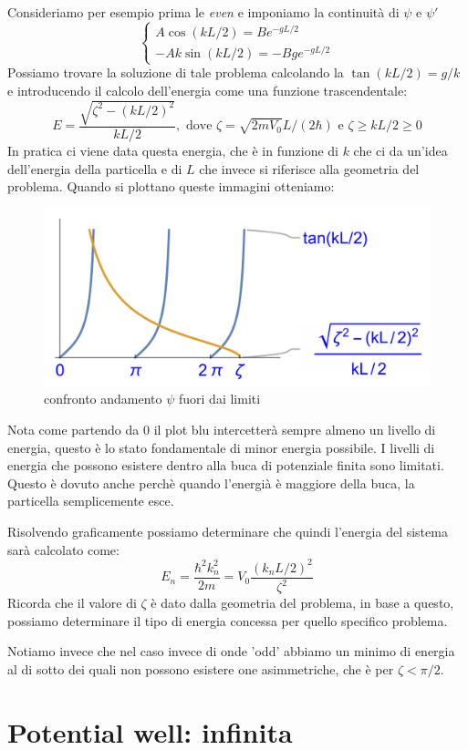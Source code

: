 Consideriamo per esempio prima le \textit{even} e imponiamo la continuità di $\psi$ e $\psi'$ 
$$\left\{  \begin{array}{l}
    A\cos(kL/2) = Be^{-gL/2} \\
    -Ak\sin(kL/2) = -Bge^{-gL/2}
\end{array} \right.$$
Possiamo trovare la soluzione di tale problema calcolando la $\tan(kL/2) = g/k$ e introducendo il calcolo dell'energia come una funzione trascendentale:
$$E = \frac{\sqrt{\zeta^2 - (kL/2)^2}}{kL/2}, \text{ dove } \zeta = \sqrt{2mV_0}L/(2\hbar) \text{ e } \zeta \geq kL/2 \geq 0$$
In pratica ci viene data questa energia, che è in funzione di $k$ che ci da un'idea dell'energia della particella e di $L$ che invece si riferisce alla geometria del problema. Quando si plottano queste immagini otteniamo:

\begin{figure}[ht]
	\centering
	\includegraphics[width=.5\textwidth]{../images/Screenshot 2025-02-17 144454.png}
	\caption{confronto andamento $\psi$ fuori dai limiti}
	\label{fig:zeta_even}
\end{figure}

\noindent Nota come partendo da 0 il plot blu intercetterà sempre almeno un livello di energia, questo è lo stato fondamentale di minor energia possibile. I livelli di energia che possono esistere dentro alla buca di potenziale finita sono limitati. Questo è dovuto anche perchè quando l'energià è maggiore della buca, la particella semplicemente esce.

Risolvendo graficamente possiamo determinare che quindi l'energia del sistema sarà calcolato come:
$$E_n = \frac{\hbar^2k^2_n}{2m} = V_0\frac{(k_nL/2)^2}{\zeta^2}$$ 
Ricorda che il valore di $\zeta$ è dato dalla geometria del problema, in base a questo, possiamo determinare il tipo di energia concessa per quello specifico problema.

Notiamo invece che nel caso invece di onde 'odd' abbiamo un minimo di energia al di sotto dei quali non possono esistere one asimmetriche, che è per $\zeta < \pi/2$.

\section{Potential well: infinita}


